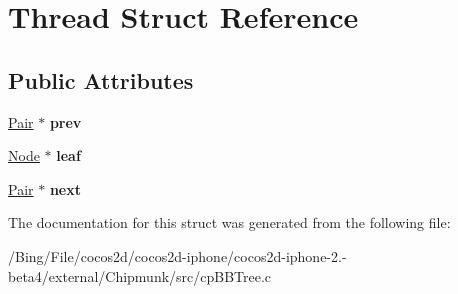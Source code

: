 \hypertarget{struct_thread}{\section{Thread Struct Reference}
\label{struct_thread}
}
\subsection*{Public Attributes}
\begin{DoxyCompactItemize}
\item 
\hypertarget{struct_thread_a93db10f496c27b9ea64b4cee1936c64b}{\hyperlink{struct_pair}{Pair} $\ast$ {\bfseries prev}}\label{struct_thread_a93db10f496c27b9ea64b4cee1936c64b}

\item 
\hypertarget{struct_thread_aafb60769d1e3949d2f50965d92aafc2b}{\hyperlink{struct_node}{Node} $\ast$ {\bfseries leaf}}\label{struct_thread_aafb60769d1e3949d2f50965d92aafc2b}

\item 
\hypertarget{struct_thread_ae8b869c02bedd4a329935f9ae0ec7c93}{\hyperlink{struct_pair}{Pair} $\ast$ {\bfseries next}}\label{struct_thread_ae8b869c02bedd4a329935f9ae0ec7c93}

\end{DoxyCompactItemize}


The documentation for this struct was generated from the following file\-:\begin{DoxyCompactItemize}
\item 
/\-Bing/\-File/cocos2d/cocos2d-\/iphone/cocos2d-\/iphone-\/2.-\/beta4/external/\-Chipmunk/src/cp\-B\-B\-Tree.\-c\end{DoxyCompactItemize}
